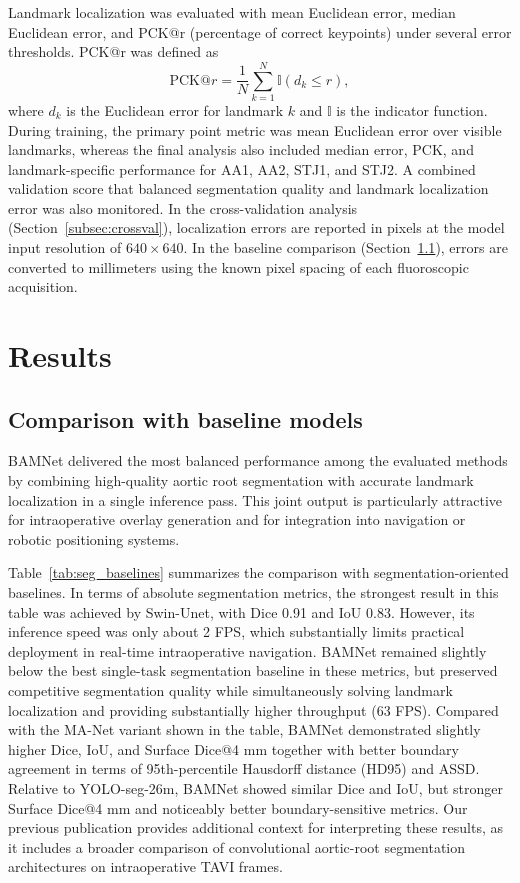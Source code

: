 \documentclass[preprint,12pt,authoryear]{elsarticle}
\begin{document}
Landmark localization was evaluated with mean Euclidean error, median Euclidean error, and PCK@r (percentage of correct keypoints) under several error thresholds. PCK@r was defined as
\begin{equation}
\mathrm{PCK}@r = \frac{1}{N}\sum_{k=1}^{N}\mathbb{I}(d_k \leq r),
\end{equation}
where $d_k$ is the Euclidean error for landmark $k$ and $\mathbb{I}$ is the indicator function. During training, the primary point metric was mean Euclidean error over visible landmarks, whereas the final analysis also included median error, PCK, and landmark-specific performance for AA1, AA2, STJ1, and STJ2. A combined validation score that balanced segmentation quality and landmark localization error was also monitored. In the cross-validation analysis (Section~\ref{subsec:crossval}), localization errors are reported in pixels at the model input resolution of $640 \times 640$. In the baseline comparison (Section~\ref{subsec:baseline_results}), errors are converted to millimeters using the known pixel spacing of each fluoroscopic acquisition.

\section{Results}

\subsection{Comparison with baseline models}
\label{subsec:baseline_results}

BAMNet delivered the most balanced performance among the evaluated methods by combining high-quality aortic root segmentation with accurate landmark localization in a single inference pass. This joint output is particularly attractive for intraoperative overlay generation and for integration into navigation or robotic positioning systems.

Table~\ref{tab:seg_baselines} summarizes the comparison with segmentation-oriented baselines. In terms of absolute segmentation metrics, the strongest result in this table was achieved by Swin-Unet, with Dice 0.91 and IoU 0.83. However, its inference speed was only about 2 FPS, which substantially limits practical deployment in real-time intraoperative navigation. BAMNet remained slightly below the best single-task segmentation baseline in these metrics, but preserved competitive segmentation quality while simultaneously solving landmark localization and providing substantially higher throughput (63 FPS). Compared with the MA-Net variant shown in the table, BAMNet demonstrated slightly higher Dice, IoU, and Surface Dice@4 mm together with better boundary agreement in terms of 95th-percentile Hausdorff distance (HD95) and ASSD. Relative to YOLO-seg-26m, BAMNet showed similar Dice and IoU, but stronger Surface Dice@4 mm and noticeably better boundary-sensitive metrics. Our previous publication \citep{laptev2025_aorticroot} provides additional context for interpreting these results, as it includes a broader comparison of convolutional aortic-root segmentation architectures on intraoperative TAVI frames.
\end{document}

